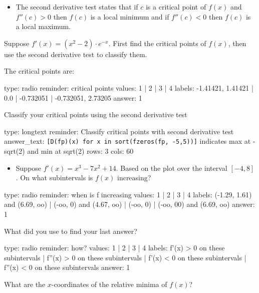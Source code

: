 \documentclass[12pt]{article}
\begin{document}
\begin{itemize}
\itemsep1pt\parskip0pt
\item
  The second derivative test states that if $c$ is a critical point of
  $f(x)$ and $f''(c) > 0$ then $f(c)$ is a local minimum and if
  $f''(c) < 0$ then $f(c)$ is a local maximum.
\end{itemize}

Suppose $f'(x) = (x^2 - 2) \cdot e^{-x}$. First find the critical points
of $f(x)$, then use the second derivative test to classify them.

The critical points are:

\begin{answer}
type: radio
reminder: critical points
values: 1 | 2 | 3 | 4
labels: -1.41421, 1.41421 | 0.0 | -0.732051 | -0.732051, 2.73205
answer: 1
\end{answer}

Classify your critical points using the second derivative test

\begin{answer}
type: longtext
reminder: Classify critical points with second derivative test
answer_text: \verb+[D(fp)(x) for x in sort(fzeros(fp, -5,5))]+ indicates max at -sqrt(2) and min at sqrt(2) 
rows: 3
cols: 60
\end{answer}

\begin{itemize}
\itemsep1pt\parskip0pt
\item
  Suppose $f'(x) = x^3 - 7x^2 + 14$. Based on the plot over the interval
  $[-4, 8]$. On what subintervals is $f(x)$ increasing?
\end{itemize}

\begin{answer}
type: radio
reminder: when is f increasing
values: 1 | 2 | 3 | 4
labels: (-1.29, 1.61) and (6.69, oo) | (-oo, 0) and (4.67, oo) | (-oo, 0) | (-oo, 00) and (6.69, oo)
answer: 1
\end{answer}

What did you use to find your last answer?

\begin{answer}
type: radio
reminder: how?
values: 1 | 2 | 3 | 4
labels: f'(x) > 0 on these subintervals | f''(x) > 0 on these subintervals | f'(x) < 0 on these subintervals | f''(x) < 0 on these subintervals
answer: 1
\end{answer}

What are the $x$-coordinates of the relative minima of $f(x)$?
\end{document}
